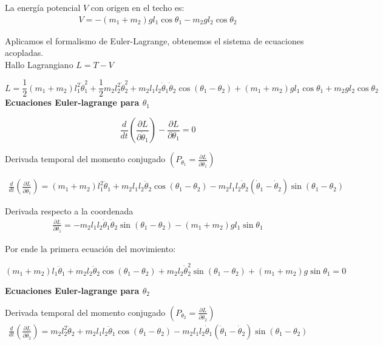 \documentclass[11pt]{article}
\begin{document}
	La energía potencial $V$ con origen en el techo es:
	\begin{align*}
		V = -(m_1+m_2)gl_1\cos\theta_1 - m_2gl_2\cos\theta_2
	\end{align*}
	
	Aplicamos el formalismo de Euler-Lagrange, obtenemos el sistema de ecuaciones acopladas. 
	\\
	Hallo Lagrangiano $L = T - V$
	
	\begin{equation}
		L = \frac{1}{2}(m_1+m_2)l_1^2\dot{\theta}_1^2 + \frac{1}{2}m_2l_2^2\dot{\theta}_2^2 + m_2l_1l_2\dot{\theta}_1\dot{\theta}_2\cos(\theta_1-\theta_2) + (m_1+m_2)gl_1\cos\theta_1 + m_2gl_2\cos\theta_2
	\end{equation}
	\textbf{ Ecuaciones Euler-lagrange para $\theta_1$}
	
	\begin{equation*}
		\frac{d}{dt}\left( \frac{\partial L}{\partial \dot{\theta}_1} \right) - \frac{\partial L}{\partial \theta_1} = 0
	\end{equation*}
	
	Derivada temporal del momento conjugado $\left(P_{\theta_1} = \frac{\partial L}{\partial \dot{\theta}_1} \right)$ 
	
	\begin{align*}
		\frac{d}{dt} \left( \frac{\partial L}{\partial \dot{\theta}_1} \right) = (m_1 + m_2)l_1^2\ddot{\theta}_1 + m_2l_1l_2\ddot{\theta}_2\cos(\theta_1 - \theta_2) - m_2l_1l_2\dot{\theta}_2(\dot{\theta}_1 - \dot{\theta}_2)\sin(\theta_1 - \theta_2)
	\end{align*}
	
	Derivada respecto a la coordenada
	\begin{align*}
		\frac{\partial L}{\partial \theta_1} = -m_2l_1l_2\dot{\theta}_1\dot{\theta}_2\sin(\theta_1 - \theta_2) - (m_1 + m_2)gl_1\sin\theta_1
	\end{align*}
	
	Por ende la primera ecuación del movimiento:

	\begin{equation}
		(m_1 + m_2)l_1 \ddot{\theta}_1 + m_2 l_2 \ddot{\theta}_2 \cos(\theta_1 - \theta_2) + m_2 l_2 \dot{\theta}_2^2 \sin(\theta_1 - \theta_2) + (m_1 + m_2)g \sin\theta_1 = 0
		\label{eq: tita 1}
	\end{equation}
	
	\textbf{ Ecuaciones Euler-lagrange para $\theta_2$}
	
	Derivada temporal del momento conjugado $\left(P_{\theta_2} = \frac{\partial L}{\partial \dot{\theta}_2} \right)$ 
	\begin{align*}
		\frac{d}{dt} \left( \frac{\partial L}{\partial \dot{\theta}_2} \right) = m_2 l_2^2 \ddot{\theta}_2 + m_2 l_1 l_2 \ddot{\theta}_1 \cos(\theta_1 - \theta_2) - m_2 l_1 l_2 \dot{\theta}_1 (\dot{\theta}_1 - \dot{\theta}_2) \sin(\theta_1 - \theta_2)
	\end{align*}
	
\end{document}
